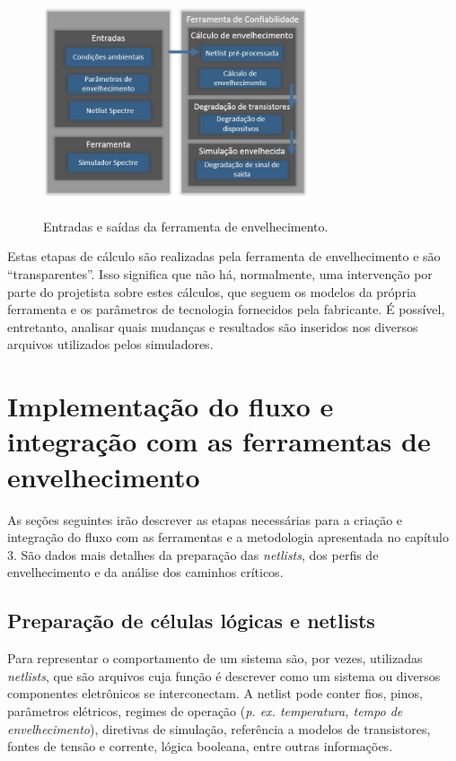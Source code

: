 \begin{figure}[H]
\center
{\includegraphics[width=0.7\textwidth]{images/fluxo_ferramenta}}
\caption{Entradas e saídas da ferramenta de envelhecimento.}
\label{figure:fluxo_ferramenta}
\end{figure}
Estas etapas de cálculo são realizadas pela ferramenta de envelhecimento e são ``transparentes''. Isso significa que não há, normalmente, uma intervenção por parte do projetista sobre estes cálculos, que seguem os modelos da própria ferramenta e os parâmetros de tecnologia fornecidos pela fabricante. É possível, entretanto, analisar quais mudanças e resultados são inseridos nos diversos arquivos utilizados pelos simuladores.
\section{Implementação do fluxo e integração com as ferramentas de envelhecimento}
\label{section_implementacao}
As seções seguintes irão descrever as etapas necessárias para a criação e integração do fluxo com as ferramentas e a metodologia apresentada no capítulo 3. São dados mais detalhes da preparação das \textit{netlists}, dos perfis de envelhecimento e da análise dos caminhos críticos.
\subsection{Preparação de células lógicas e netlists}
\label{subsection_celulas}
Para representar o comportamento de um sistema são, por vezes, utilizadas \textit{netlists}, que são arquivos cuja função é descrever como um sistema ou diversos componentes eletrônicos se interconectam. A netlist pode conter fios, pinos, parâmetros elétricos, regimes de operação (\textit{p. ex. temperatura, tempo de envelhecimento}), diretivas de simulação, referência a modelos de transistores, fontes de tensão e corrente, lógica booleana, entre outras informações.

